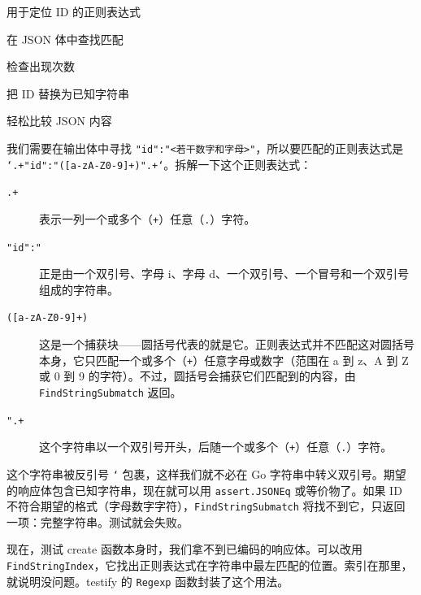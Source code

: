 \begin{codeannotations}
\item 用于定位 ID 的正则表达式
\item 在 JSON 体中查找匹配
\item 检查出现次数
\item 把 ID 替换为已知字符串
\item 轻松比较 JSON 内容
\end{codeannotations}

我们需要在输出体中寻找 \texttt{"id":"<若干数字和字母>"}，所以要匹配的正则表达式是 \texttt{`.+"id":"([a-zA-Z0-9]+)".+`}。拆解一下这个正则表达式：

\begin{description}
  \item[\texttt{.+}] 表示一列一个或多个（\texttt{+}）任意（\texttt{.}）字符。
  \item[\texttt{"id":"}] 正是由一个双引号、字母 i、字母 d、一个双引号、一个冒号和一个双引号组成的字符串。
  \item[\texttt{([a-zA-Z0-9]+)}] 这是一个捕获块——圆括号代表的就是它。正则表达式并不匹配这对圆括号本身，它只匹配一个或多个（\texttt{+}）任意字母或数字（范围在 a 到 z、A 到 Z 或 0 到 9 的字符）。不过，圆括号会捕获它们匹配到的内容，由 \texttt{FindStringSubmatch} 返回。
  \item[\texttt{".+}] 这个字符串以一个双引号开头，后随一个或多个（\texttt{+}）任意（\texttt{.}）字符。
\end{description}

这个字符串被反引号 \texttt{`} 包裹，这样我们就不必在 Go 字符串中转义双引号。期望的响应体包含已知字符串，现在就可以用 \texttt{assert.JSONEq} 或等价物了。如果 ID 不符合期望的格式（字母数字字符），\texttt{FindStringSubmatch} 将找不到它，只返回一项：完整字符串。测试就会失败。

现在，测试 create 函数本身时，我们拿不到已编码的响应体。可以改用 \texttt{FindStringIndex}，它找出正则表达式在字符串中最左匹配的位置。索引在那里，就说明没问题。testify 的 \texttt{Regexp} 函数封装了这个用法。



